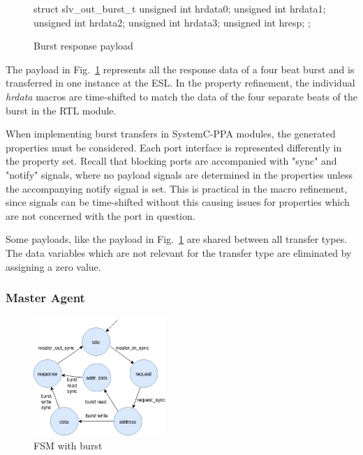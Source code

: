 \begin{figure}[h!] 
\begin{C++}
struct slv_out_burst_t{
    unsigned int hrdata0;
    unsigned int hrdata1;
    unsigned int hrdata2;
    unsigned int hrdata3;
    unsigned int hresp;
};
\end{C++}
\caption{Burst response payload}
\label{fig:burst-resp-payload}
\end{figure}
The payload in Fig.~\ref{fig:burst-resp-payload} represents all the response data of a four beat burst and is transferred in one instance at the ESL. In the property refinement, the individual \textit{hrdata} macros are time-shifted to match the data of the four separate beats of the burst in the RTL module.

When implementing burst transfers in SystemC-PPA modules, the generated properties must be considered. Each port interface is represented differently in the property set. Recall that blocking ports are accompanied with "sync" and "notify" signals, where no payload signals are determined in the properties unless the accompanying notify signal is set. This is practical in the macro refinement, since signals can be time-shifted without this causing issues for properties which are not concerned with the port in question. \par
Some payloads, like the payload in Fig.~\ref{fig:burst-resp-payload} are shared between all transfer types. The data variables which are not relevant for the transfer type are eliminated by assigning a zero value.  


\subsubsection{Master Agent}
\begin{figure}
\includegraphics[width=5cm]{figs/ESL/mAgent_burstesl.png}
\caption{FSM with burst}\label{fig:magt-burstesl}
\end{figure} 

